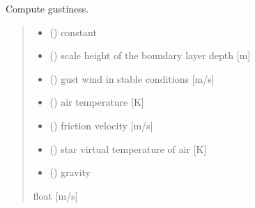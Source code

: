 \documentclass[letterpaper,10pt,english]{sphinxmanual}
\begin{document}
\begin{fulllineitems}

\pysigstartsignatures
{}
\pysigstopsignatures
\sphinxAtStartPar
Compute gustiness.
\begin{quote}\begin{description}
\begin{itemize}
\item {} 
\sphinxAtStartPar
{} () \textendash{} constant

\item {} 
\sphinxAtStartPar
{} () \textendash{} scale height of the boundary layer depth {[}m{]}

\item {} 
\sphinxAtStartPar
{} () \textendash{} gust wind in stable conditions   {[}m/s{]}

\item {} 
\sphinxAtStartPar
{} () \textendash{} air temperature   {[}K{]}

\item {} 
\sphinxAtStartPar
{} () \textendash{} friction velocity {[}m/s{]}

\item {} 
\sphinxAtStartPar
{} () \textendash{} star virtual temperature of air {[}K{]}

\item {} 
\sphinxAtStartPar
{} () \textendash{} gravity

\end{itemize}

\sphinxAtStartPar
{}

\sphinxAtStartPar
float        {[}m/s{]}

\end{description}\end{quote}

\end{fulllineitems}
\end{document}
